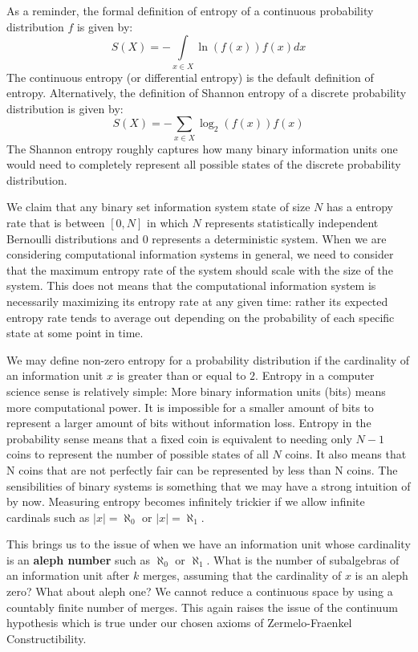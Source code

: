 \documentclass[10pt, a5paper, twoside, openright]{memoir}
\begin{document}
As a reminder, the formal definition of entropy of a continuous probability distribution $f$ is given by:
$$S(X) = - \int\limits_{x \in X} \ln (f(x)) f(x) dx $$
The continuous entropy (or differential entropy) is the default definition of entropy. Alternatively, the definition of Shannon entropy of a discrete probability distribution is given by:
$$S(X) = - \sum\limits_{x \in X} \log_2 (f(x)) f(x) $$
The Shannon entropy roughly captures how many binary information units one would need to completely represent all possible states of the discrete probability distribution.

We claim that any binary set information system state of size $N$ has a entropy rate that is between $[0, N]$ in which $N$ represents statistically independent Bernoulli distributions and $0$ represents a deterministic system. When we are considering computational information systems in general, we need to consider that the maximum entropy rate of the system should scale with the size of the system. This does not means that the computational information system is necessarily maximizing its entropy rate at any given time: rather its expected entropy rate tends to average out depending on the probability of each specific state at some point in time.

We may define non-zero entropy for a probability distribution if the cardinality of an information unit $x$ is greater than or equal to $2$. Entropy in a computer science sense is relatively simple: More binary information units (bits) means more computational power. It is impossible for a smaller amount of bits to represent a larger amount of bits without information loss. Entropy in the probability sense means that a fixed coin is equivalent to needing only $N-1$ coins to represent the number of possible states of all $N$ coins. It also means that N coins that are not perfectly fair can be represented by less than N coins. The sensibilities of binary systems is something that we may have a strong intuition of by now. Measuring entropy becomes infinitely trickier if we allow infinite cardinals such as $|x| = \aleph_0$ or $|x| = \aleph_1$.

This brings us to the issue of when we have an information unit whose cardinality is an \textbf{aleph number} such as $\aleph_0$ or $\aleph_1$. What is the number of subalgebras of an information unit after $k$ merges, assuming that the cardinality of $x$ is an aleph zero? What about aleph one? We cannot reduce a continuous space by using a countably finite number of merges. This again raises the issue of the continuum hypothesis which is true under our chosen axioms of Zermelo-Fraenkel Constructibility.
\end{document}

